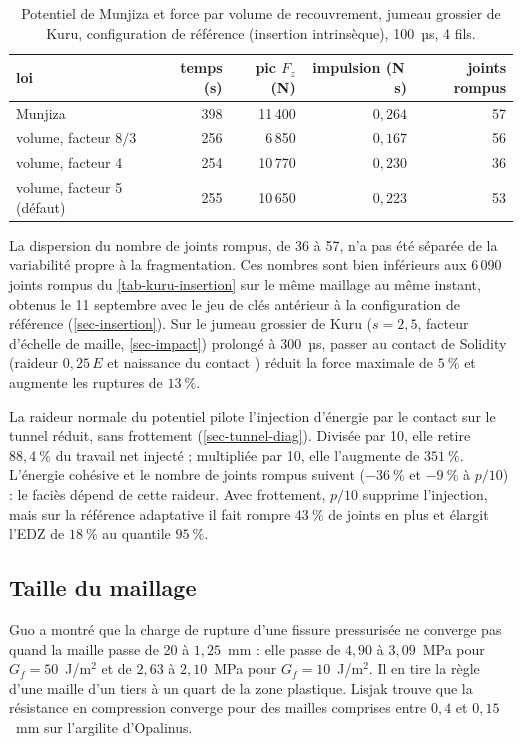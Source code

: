 \begin{table}[htbp]
\centering
\caption{Potentiel de Munjiza et force par volume de recouvrement, jumeau grossier de Kuru, configuration de référence (insertion intrinsèque), 100~µs, 4 fils.}
\label{tab-potvolume}
\small
\begin{tabular}{@{}lrrrr@{}}
\toprule
loi & temps (s) & pic $F_z$ (N) & impulsion (N\,s) & joints rompus \\
\midrule
Munjiza & 398 & 11\,400 & $0{,}264$ & 57 \\
volume, facteur $8/3$ & 256 & 6\,850 & $0{,}167$ & 56 \\
volume, facteur 4 & 254 & 10\,770 & $0{,}230$ & 36 \\
volume, facteur 5 (défaut) & 255 & 10\,650 & $0{,}223$ & 53 \\
\bottomrule
\end{tabular}
\end{table}

La dispersion du nombre de joints rompus, de 36 à 57, n'a pas été séparée de la variabilité propre à la fragmentation. Ces nombres sont bien inférieurs aux 6\,090 joints rompus du \cref{tab-kuru-insertion} sur le même maillage au même instant, obtenus le 11 septembre avec le jeu de clés antérieur à la configuration de référence (\cref{sec-insertion}). Sur le jumeau grossier de Kuru ($s = 2{,}5$, facteur d'échelle de maille, \cref{sec-impact}) prolongé à 300~µs, passer au contact de Solidity (raideur $0{,}25\,E$ et naissance du contact ) réduit la force maximale de $5~\%$ et augmente les ruptures de $13~\%$.

La raideur normale du potentiel pilote l'injection d'énergie par le contact sur le tunnel réduit, sans frottement (\cref{sec-tunnel-diag}). Divisée par 10, elle retire $88{,}4~\%$ du travail net injecté ; multipliée par 10, elle l'augmente de $351~\%$. L'énergie cohésive et le nombre de joints rompus suivent ($-36~\%$ et $-9~\%$ à $p/10$) : le faciès dépend de cette raideur. Avec frottement, $p/10$ supprime l'injection, mais sur la référence adaptative il fait rompre $43~\%$ de joints en plus et élargit l'EDZ de $18~\%$ au quantile $95~\%$.

\subsection{Taille du maillage}

Guo a montré que la charge de rupture d'une fissure pressurisée ne converge pas quand la maille passe de 20 à $1{,}25$~mm : elle passe de $4{,}90$ à $3{,}09$~MPa pour $G_f = 50$~J/m$^2$ et de $2{,}63$ à $2{,}10$~MPa pour $G_f = 10$~J/m$^2$. Il en tire la règle d'une maille d'un tiers à un quart de la zone plastique. Lisjak trouve que la résistance en compression converge pour des mailles comprises entre $0{,}4$ et $0{,}15$~mm sur l'argilite d'Opalinus.


